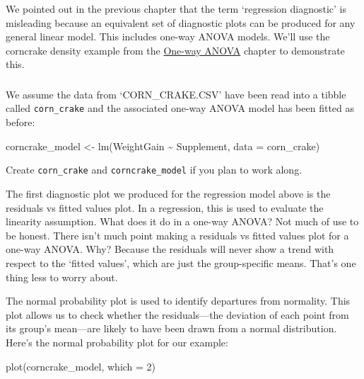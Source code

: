 \documentclass[
]{book}
\newenvironment{Shaded}{\begin{snugshade}}{\end{snugshade}}
\newcommand{\AttributeTok}[1]{\textcolor[rgb]{0.77,0.63,0.00}{#1}}
\newcommand{\DecValTok}[1]{\textcolor[rgb]{0.00,0.00,0.81}{#1}}
\newcommand{\FunctionTok}[1]{\textcolor[rgb]{0.00,0.00,0.00}{#1}}
\newcommand{\NormalTok}[1]{#1}
\newcommand{\OtherTok}[1]{\textcolor[rgb]{0.56,0.35,0.01}{#1}}
\newcommand{\SpecialCharTok}[1]{\textcolor[rgb]{0.00,0.00,0.00}{#1}}
\newenvironment{greybox}{
  \definecolor{shadecolor}{rgb}{0.95,0.95,0.95}  %
  \color{black}
  \begin{shaded}}
 {\end{shaded}}
\newenvironment{infobox}[1]
  {
  \begin{itemize}
  \renewcommand{\labelitemi}{
    \raisebox{-.7\height}[0pt][0pt]{
      {\setkeys{Gin}{width=3em,keepaspectratio}
        \texttt{[image: images/\#1]}}
    }
  }
  \setlength{\fboxsep}{1em}
  \begin{greybox}
  \item
  }
  {
  \end{greybox}
  \end{itemize}
  }
\begin{document}
We pointed out in the previous chapter that the term `regression diagnostic' is misleading because an equivalent set of diagnostic plots can be produced for any general linear model. This includes one-way ANOVA models. We'll use the corncrake density example from the \protect\hyperlink{one-way-anova-in-R}{One-way ANOVA} chapter to demonstrate this.

\begin{infobox}{action}

\hypertarget{section-16}{%
\subsubsection*{}\label{section-16}}

We assume the data from `CORN\_CRAKE.CSV' have been read into a tibble called \texttt{corn\_crake} and the associated one-way ANOVA model has been fitted as before:

\begin{Shaded}
\begin{Highlighting}[]
\NormalTok{corncrake\_model }\OtherTok{\textless{}{-}} \FunctionTok{lm}\NormalTok{(WeightGain }\SpecialCharTok{\textasciitilde{}}\NormalTok{ Supplement, }\AttributeTok{data =}\NormalTok{ corn\_crake)}
\end{Highlighting}
\end{Shaded}

Create \texttt{corn\_crake} and \texttt{corncrake\_model} if you plan to work along.

\end{infobox}

The first diagnostic plot we produced for the regression model above is the residuals vs fitted values plot. In a regression, this is used to evaluate the linearity assumption. What does it do in a one-way ANOVA? Not much of use to be honest. There isn't much point making a residuals vs fitted values plot for a one-way ANOVA. Why? Because the residuals will never show a trend with respect to the `fitted values', which are just the group-specific means. That's one thing less to worry about.

The normal probability plot is used to identify departures from normality. This plot allows us to check whether the residuals---the deviation of each point from its group's mean---are likely to have been drawn from a normal distribution. Here's the normal probability plot for our example:

\begin{Shaded}
\begin{Highlighting}[]
\FunctionTok{plot}\NormalTok{(corncrake\_model, }\AttributeTok{which =} \DecValTok{2}\NormalTok{)}
\end{Highlighting}
\end{Shaded}
\end{document}
